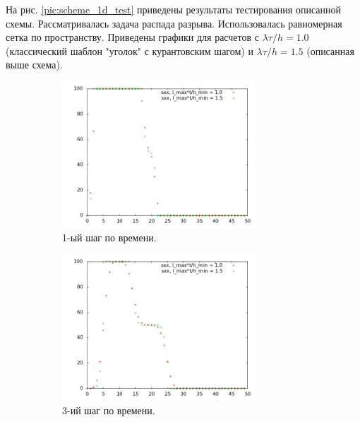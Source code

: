 На рис. \ref{pic:scheme_1d_test} приведены результаты тестирования описанной схемы. Рассматривалась задача распада разрыва. Использовалась равномерная сетка по пространству. Приведены графики для расчетов с $\lambda \tau / h = 1.0$ (классический шаблон "уголок" с курантовским шагом) и $\lambda \tau / h = 1.5$ (описанная выше схема).

\begin{figure}[htp]
\begin{subfigure}[b]{0.5\textwidth}
\centering
\includegraphics[width=0.8\textwidth]{png/big-sigma-test-results-1d/snap-1.png}
\caption{1-ый шаг по времени.}
\end{subfigure}
\begin{subfigure}[b]{0.5\textwidth}
\centering
\includegraphics[width=0.8\textwidth]{png/big-sigma-test-results-1d/snap-3.png}
\caption{3-ий шаг по времени.}
\end{subfigure}
\begin{subfigure}[b]{0.5\textwidth}
\centering

\end{subfigure}
\end{figure}
